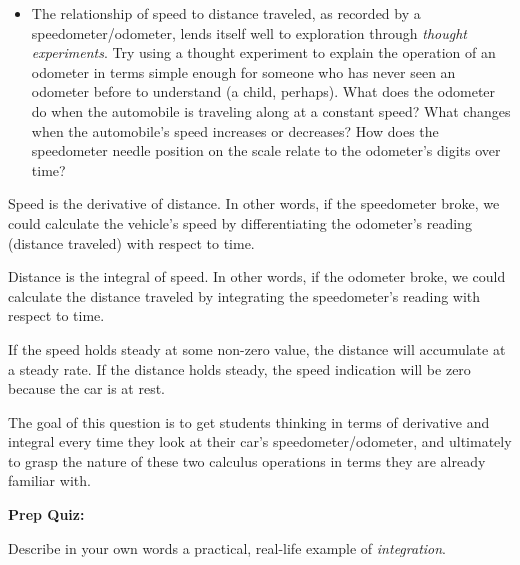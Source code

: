\begin{itemize}
\item{} The relationship of speed to distance traveled, as recorded by a speedometer/odometer, lends itself well to exploration through {\it thought experiments}.  Try using a thought experiment to explain the operation of an odometer in terms simple enough for someone who has never seen an odometer before to understand (a child, perhaps).  What does the odometer do when the automobile is traveling along at a constant speed?  What changes when the automobile's speed increases or decreases?  How does the speedometer needle position on the scale relate to the odometer's digits over time?
\end{itemize}







Speed is the derivative of distance.  In other words, if the speedometer broke, we could calculate the vehicle's speed by differentiating the odometer's reading (distance traveled) with respect to time.

\vskip 10pt

Distance is the integral of speed.  In other words, if the odometer broke, we could calculate the distance traveled by integrating the speedometer's reading with respect to time.

\vskip 10pt

If the speed holds steady at some non-zero value, the distance will accumulate at a steady rate.  If the distance holds steady, the speed indication will be zero because the car is at rest.







The goal of this question is to get students thinking in terms of derivative and integral every time they look at their car's speedometer/odometer, and ultimately to grasp the nature of these two calculus operations in terms they are already familiar with.










\vfil \eject

\noindent
{\bf Prep Quiz:}

Describe in your own words a practical, real-life example of {\it integration}. 



